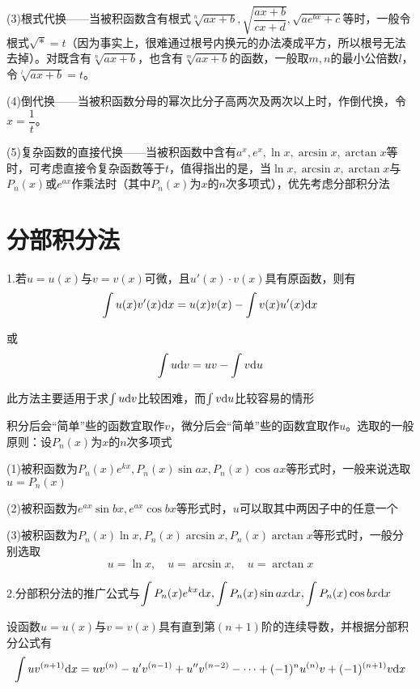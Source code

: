 (3)根式代换——当被积函数含有根式$\sqrt[n]{ax+b},\sqrt{\dfrac{ax+b}{cx+d}},\sqrt{ae^{bx}+c}$等时，一般令根式$\sqrt{*}=t$（因为事实上，很难通过根号内换元的办法凑成平方，所以根号无法去掉）。对既含有$\sqrt[n]{ax+b}$，也含有$\sqrt[m]{ax+b}$的函数，一般取$m,n$的最小公倍数$l$，令$\sqrt[l]{ax+b}=t$。
\vspace{2mm}

(4)倒代换——当被积函数分母的幂次比分子高两次及两次以上时，作倒代换，令$x=\dfrac{1}{t}$。
\vspace{2mm}

(5)复杂函数的直接代换——当被积函数中含有$a^x,e^x,\ln x,\arcsin x,\arctan x$等时，可考虑直接令复杂函数等于$t$，值得指出的是，当$\ln x,\arcsin x,\arctan x$与$P_n(x)$或$e^{ax}$作乘法时（其中$P_n(x)$为$x$的$n$次多项式），优先考虑分部积分法

\section{分部积分法}
1.若$u=u(x)$与$v=v(x)$可微，且$u'(x)\cdot v(x)$具有原函数，则有
\begin{equation}
    \int u(x)v'(x)\mathrm{d} x=u(x)v(x)-\int v(x)u'(x)\mathrm{d} x
    \nonumber
\end{equation}

或
\begin{equation}
    \int u\mathrm{d} v=uv-\int v\mathrm{d} u
    \nonumber
\end{equation}

此方法主要适用于求$\int u\mathrm{d} v$比较困难，而$\int v\mathrm{d} u$比较容易的情形

积分后会“简单”些的函数宜取作$v$，微分后会“简单”些的函数宜取作$u$。选取的一般原则：设$P_n(x)$为$x$的$n$次多项式

(1)被积函数为$P_n(x)e^{kx},P_n(x)\sin ax,P_n(x)\cos ax$等形式时，一般来说选取$u=P_n(x)$

(2)被积函数为$e^{ax}\sin bx, e^{ax}\cos bx$等形式时，$u$可以取其中两因子中的任意一个

(3)被积函数为$P_n(x)\ln x,P_n(x)\arcsin x,P_n(x)\arctan x$等形式时，一般分别选取
\begin{equation}
    u=\ln x, \quad u=\arcsin x,\quad u=\arctan x
    \nonumber
\end{equation}

2.分部积分法的推广公式与$\displaystyle\int P_n(x)e^{kx}\mathrm{d} x,\int P_n(x)\sin ax\mathrm{d} x,\int P_n(x)\cos bx\mathrm{d} x$

设函数$u=u(x)$与$v=v(x)$具有直到第$(n+1)$阶的连续导数，并根据分部积分公式有
\begin{equation}
    \int uv^{(n+1)}\mathrm{d} x=uv^{(n)}-u'v^{(n-1)}+u''v^{(n-2)}-\cdots+(-1)^n u^{(n)}v+(-1)^{(n+1)}v\mathrm{d} x
    \nonumber
\end{equation}


